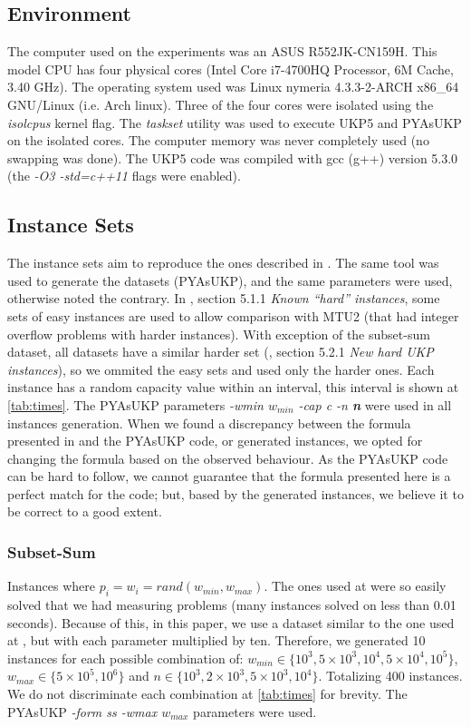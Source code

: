 \documentclass[runningheads,a4paper]{llncs}
\begin{document}
\subsection{Environment}

The computer used on the experiments was an ASUS R552JK-CN159H. This model CPU has four physical cores (Intel Core i7-4700HQ Processor, 6M Cache, 3.40 GHz). The operating system used was Linux nymeria 4.3.3-2-ARCH x86\_64 GNU/Linux (i.e. Arch linux). Three of the four cores were isolated using the \emph{isolcpus} kernel flag. The \emph{taskset} utility was used to execute UKP5 and PYAsUKP on the isolated cores. The computer memory was never completely used (no swapping was done). The UKP5 code was compiled with gcc (g++) version 5.3.0 (the \emph{-O3 -std=c++11} flags were enabled).

\subsection{Instance Sets}

The instance sets aim to reproduce the ones described in \cite{CPYA}. The same tool was used to generate the datasets (PYAsUKP), and the same parameters were used, otherwise noted the contrary. In \cite{CPYA}, section 5.1.1 \emph{Known ``hard'' instances}, some sets of easy instances are used to allow comparison with MTU2 (that had integer overflow problems with harder instances). With exception of the subset-sum dataset, all datasets have a similar harder set (\cite{CPYA}, section 5.2.1 \emph{New hard UKP instances}), so we ommited the easy sets and used only the harder ones. Each instance has a random capacity value within an interval, this interval is shown at \ref{tab:times}. The PYAsUKP parameters \emph{-wmin \(w_{min}\) -cap c -n \textbf{n}} were used in all instances generation. When we found a discrepancy between the formula presented in \cite{CPYA} and the PYAsUKP code, or generated instances, we opted for changing the formula based on the observed behaviour. As the PYAsUKP code can be hard to follow, we cannot guarantee that the formula presented here is a perfect match for the code; but, based by the generated instances, we believe it to be correct to a good extent.

\subsubsection{Subset-Sum}\label{sec:subsetsum}
Instances where \(p_i = w_i = rand(w_{min}, w_{max})\). The ones used at \cite{CPYA} were so easily solved that we had measuring problems (many instances solved on less than 0.01 seconds). Because of this, in this paper, we use a dataset similar to the one used at \cite{CPYA}, but with each parameter multiplied by ten. Therefore, we generated 10 instances for each possible combination of: \(w_{min} \in \{10^3, 5\times10^3, 10^4, 5\times10^4, 10^5\}\), \(w_{max} \in \{5\times10^5, 10^6\}\) and \(n \in \{10^3, 2\times10^3, 5\times10^3, 10^4\}\). Totalizing 400 instances. We do not discriminate each combination at \ref{tab:times} for brevity. The PYAsUKP \emph{-form ss -wmax \(w_{max}\)} parameters were used.
\end{document}
